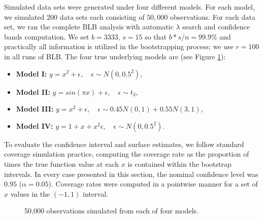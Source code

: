 \documentclass{statsoc}
\begin{document}
Simulated data sets were generated under four different models. For each model, we simulated $200$ data sets each consisting of $50,000$ observations. For each data set, we ran the complete BLB analysis with automatic $\lambda$ search and confidence bands computation. We set $b=3333$, $s=15$ so that $b*s/n=99.9\%$ and practically all information is utilized in the bootstrapping process; we use $r=100$ in all runs of BLB. The four true underlying models are (see Figure \ref{fig:sim}):
\begin{itemize}
    \item \textbf{Model I:} $y=x^2+\epsilon, \quad \epsilon\sim N(0,0.5^2)$,
    \item \textbf{Model II:} $y=sin(\pi x)+\epsilon, \quad \epsilon\sim t_3$,
    \item \textbf{Model III:} $y=x^2+\epsilon, \quad \epsilon\sim 0.45N(0,1)+0.55N(3,1)$,
    \item \textbf{Model IV:} $y=1+x+x^2\epsilon, \quad \epsilon\sim N(0,0.5^2) $.
\end{itemize}
To evaluate the confidence interval and surface estimates,  we follow standard coverage simulation practice, computing the coverage rate as the proportion of times the true function value at each $x$ is contained within the bootstrap intervals.  In every case presented in this section, the nominal confidence level was $0.95$ ($\alpha=0.05$). Coverage rates were computed in a pointwise manner for a set of $x$ values in the $(-1,1)$ interval.
\begin{figure}
\centering   
\caption{50,000 observations simulated from each of four models.}
    \label{fig:sim}
\end{figure}
\end{document}
